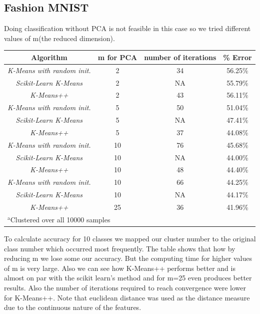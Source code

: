 \documentclass[conference]{IEEEtran}
\begin{document}
\subsection{Fashion MNIST}
Doing classification without PCA is not feasible in this case so we tried different values of m(the reduced dimension).
\begin{table}[htbp]
\begin{center}
\begin{tabular}{|c|c|c|c|}
\hline
\textbf{Algorithm}&\textbf{m for PCA}&\textbf{number of iterations}&\textbf{\% Error} \\
\hline
\textit{K-Means with random init.} &2&34&56.25\%\\
\hline
\textit{Scikit-Learn K-Means}&2&NA&55.79\%\\
\hline
\textit{K-Means++}&2&43&56.11\%\\
\hline
\textit{K-Means with random init.} &5&50&51.04\%\\
\hline
\textit{Scikit-Learn K-Means}&5&NA&47.41\%\\
\hline
\textit{K-Means++}&5&37&44.08\%\\
\hline
\textit{K-Means with random init.} &10&76&45.68\%\\
\hline
\textit{Scikit-Learn K-Means}&10&NA&44.00\%\\
\hline
\textit{K-Means++}&10&48&44.40\%\\
\hline
\textit{K-Means with random init.} &10&66&44.25\%\\
\hline
\textit{Scikit-Learn K-Means}&10&NA&44.17\%\\
\hline
\textit{K-Means++}&25&36&41.96\%\\
\hline
\multicolumn{4}{l}{$^{\mathrm{a}}$Clustered over all 10000 samples}
\end{tabular}
\label{tab1}
\end{center}
\end{table}
\newline
To calculate accuracy for 10 classes we mapped our cluster number to the original class number which occurred most frequently.\newline
The table shows that how by reducing m we lose some our accuracy. But the computing time for higher values of m is very large. Also we can see how K-Means++ performs better and is almost on par with the scikit learn's method and for m=25 even produces better results. Also the number of iterations required to reach convergence were lower for K-Means++. Note that euclidean distance was used as the distance measure due to the continuous nature of the features.
\end{document}
